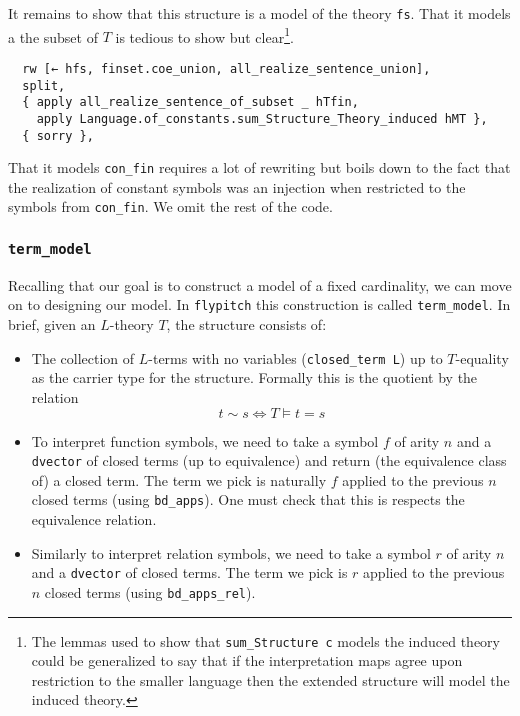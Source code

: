 It remains to show that this structure is a model of the theory \texttt{fs}.
That it models a the subset of $T$ is tedious to show but clear\footnote{
  The lemmas used to show that \texttt{sum\_Structure c} models the induced
  theory could be generalized to say that if the
  interpretation maps agree upon restriction to the smaller language
  then the extended structure will model the induced theory. }.

\begin{lstlisting}
  rw [← hfs, finset.coe_union, all_realize_sentence_union],
  split,
  { apply all_realize_sentence_of_subset _ hTfin,
    apply Language.of_constants.sum_Structure_Theory_induced hMT },
  { sorry }, \end{lstlisting}

That it models \texttt{con\_fin} requires a lot of rewriting but
boils down to the fact that the realization of constant symbols
was an injection when restricted to the symbols from \texttt{con\_fin}.
We omit the rest of the code.

\subsubsection{\texttt{term\_model}}

Recalling that our goal is to construct a model of a fixed cardinality,
we can move on to designing our model.
In \texttt{flypitch} this construction is called \texttt{term\_model}.
In brief, given an $L$-theory $T$, the structure consists of:
\begin{itemize}
  \item The collection of $L$-terms with no variables (\texttt{closed\_term L})
        up to $T$-equality as the
        carrier type for the structure.
        Formally this is the quotient by the relation
        \[ t \sim s \iff T \vDash t = s \]
  \item To interpret function symbols, we need to take a
        symbol $f$ of arity $n$ and a \texttt{dvector} of closed terms
        (up to equivalence) and return (the equivalence class of) a closed term.
        The term we pick is naturally $f$
        applied to the previous $n$ closed terms (using \texttt{bd\_apps}).
        One must check that this is respects the equivalence relation.
  \item Similarly to interpret relation symbols, we need to take a
        symbol $r$ of arity $n$ and a \texttt{dvector} of closed terms.
        The term we pick is $r$ applied to the previous $n$ closed terms
        (using \texttt{bd\_apps\_rel}).
\end{itemize}

